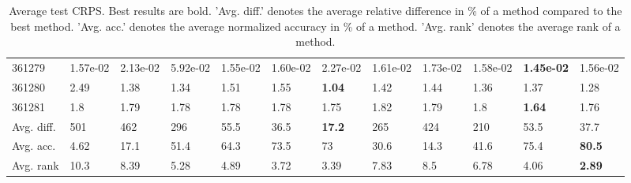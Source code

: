 \begin{table}[ht!]
\begin{tabular}{llllllllllll}
  361279 & 1.57e-02 & 2.13e-02 & 5.92e-02 & 1.55e-02 & 1.60e-02 & 2.27e-02 & 1.61e-02 & 1.73e-02 & 1.58e-02 & \textbf{1.45e-02} & 1.56e-02 \\ 
  361280 & 2.49 & 1.38 & 1.34 & 1.51 & 1.55 & \textbf{1.04} & 1.42 & 1.44 & 1.36 & 1.37 & 1.28 \\ 
  361281 & 1.8 & 1.79 & 1.78 & 1.78 & 1.78 & 1.75 & 1.82 & 1.79 & 1.8 & \textbf{1.64} & 1.76 \\ 
   \hline
Avg. diff. & 501 & 462 & 296 & 55.5 & 36.5 & \textbf{17.2} & 265 & 424 & 210 & 53.5 & 37.7 \\ 
  Avg. acc. & 4.62 & 17.1 & 51.4 & 64.3 & 73.5 & 73 & 30.6 & 14.3 & 41.6 & 75.4 & \textbf{80.5} \\ 
  Avg. rank & 10.3 & 8.39 & 5.28 & 4.89 & 3.72 & 3.39 & 7.83 & 8.5 & 6.78 & 4.06 & \textbf{2.89} \\ 
   \hline
\hline
\end{tabular}
\endgroup
\caption{Average test CRPS. 
                  Best results are bold. 
                  'Avg. diff.' denotes the average relative difference in \% of a method compared to the best method.
                  'Avg. acc.' denotes the average normalized accuracy in \% of a method.
                  'Avg. rank' denotes the average rank of a method.} 
\label{TABLES/table_results_CRPS_mahalanobis}
\end{table}
